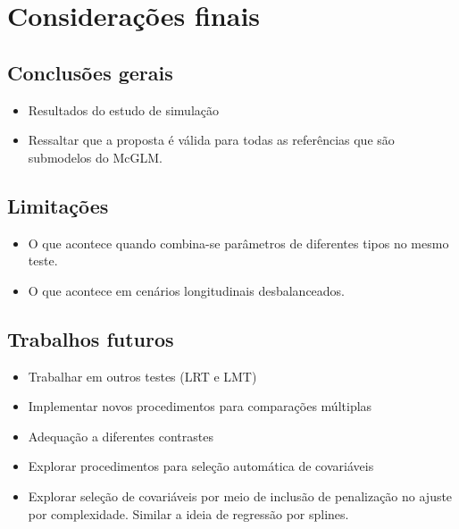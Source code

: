 
\chapter{Considerações finais}


\section{Conclusões gerais}

\begin{itemize}
  \item Resultados do estudo de simulação
  \item Ressaltar que a proposta é válida para todas as referências que são submodelos do McGLM.
\end{itemize}


\section{Limitações}

\begin{itemize}
  \item O que acontece quando combina-se parâmetros de diferentes tipos no mesmo teste.
  \item O que acontece em cenários longitudinais desbalanceados.
\end{itemize}


\section{Trabalhos futuros}

\begin{itemize}
  \item Trabalhar em outros testes (LRT e LMT)
  \item Implementar novos procedimentos para comparações múltiplas
  \item Adequação a diferentes contrastes
  \item Explorar procedimentos para seleção automática de covariáveis
  \item Explorar seleção de covariáveis por meio de inclusão de penalização no ajuste por complexidade. Similar a ideia de regressão por splines.
\end{itemize}

